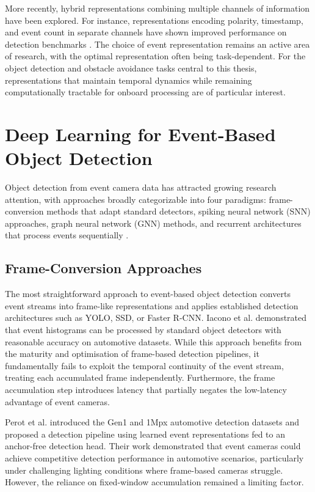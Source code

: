 \documentclass[11pt, a4paper]{report}
\begin{document}
More recently, hybrid representations combining multiple channels of information have been explored. For instance, representations encoding polarity, timestamp, and event count in separate channels have shown improved performance on detection benchmarks \cite{innocenti2021temporal}. The choice of event representation remains an active area of research, with the optimal representation often being task-dependent. For the object detection and obstacle avoidance tasks central to this thesis, representations that maintain temporal dynamics while remaining computationally tractable for onboard processing are of particular interest. 

\section{Deep Learning for Event-Based Object Detection}
Object detection from event camera data has attracted growing research attention, with approaches broadly categorizable into four paradigms: frame-conversion methods that adapt standard detectors, spiking neural network (SNN) approaches, graph neural network (GNN) methods, and recurrent architectures that process events sequentially \cite{zheng2023deep}. 

\subsection{Frame-Conversion Approaches}
The most straightforward approach to event-based object detection converts event streams into frame-like representations and applies established detection architectures such as YOLO, SSD, or Faster R-CNN. Iacono et al. \cite{iacono2018towards} demonstrated that event histograms can be processed by standard object detectors with reasonable accuracy on automotive datasets. While this approach benefits from the maturity and optimisation of frame-based detection pipelines, it fundamentally fails to exploit the temporal continuity of the event stream, treating each accumulated frame independently. Furthermore, the frame accumulation step introduces latency that partially negates the low-latency advantage of event cameras. 

Perot et al. \cite{perot2020learning} introduced the Gen1 and 1Mpx automotive detection datasets and proposed a detection pipeline using learned event representations fed to an anchor-free detection head. Their work demonstrated that event cameras could achieve competitive detection performance in automotive scenarios, particularly under challenging lighting conditions where frame-based cameras struggle. However, the reliance on fixed-window accumulation remained a limiting factor.
\end{document}
